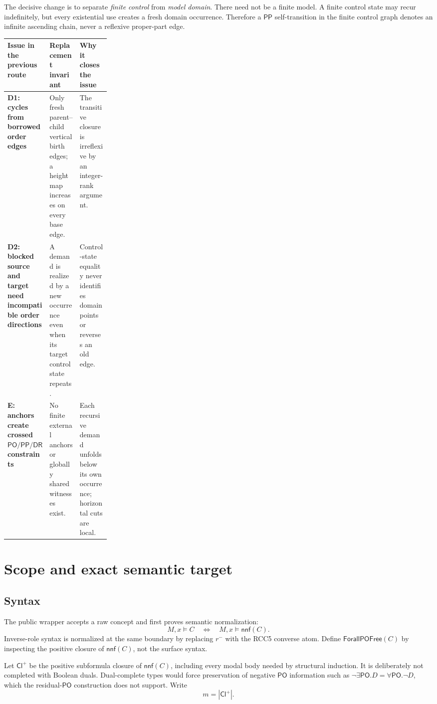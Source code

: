 \documentclass[11pt]{article}
\newcommand{\PP}{\mathsf{PP}}
\newcommand{\PO}{\mathsf{PO}}
\newcommand{\DR}{\mathsf{DR}}
\newcommand{\Cl}{\mathsf{Cl}^{+}}
\begin{document}
The decisive change is to separate \emph{finite control} from \emph{model domain}.
There need not be a finite model. A finite control state may recur indefinitely, but every
existential use creates a fresh domain occurrence. Therefore a $\PP$ self-transition in
the finite control graph denotes an infinite ascending chain, never a reflexive
proper-part edge.

\begin{center}
\renewcommand{\arraystretch}{1.25}
\begin{tabularx}{\linewidth}{>{\bfseries}p{0.24\linewidth}XX}
\toprule
Issue in the previous route & Replacement invariant & Why it closes the issue \\
\midrule
D1: cycles from borrowed order edges &
Only fresh parent--child vertical birth edges; a height map increases on every base edge. &
The transitive closure is irreflexive by an integer-rank argument. \\
D2: blocked source and target need incompatible order directions &
A demand is realized by a new occurrence even when its target control state repeats. &
Control-state equality never identifies domain points or reverses an old edge. \\
E: anchors create crossed $\PO/\PP/\DR$ constraints &
No finite external anchors or globally shared witnesses exist. &
Each recursive demand unfolds below its own occurrence; horizontal cuts are local. \\
\bottomrule
\end{tabularx}
\end{center}

\section{Scope and exact semantic target}

\subsection{Syntax}

The public wrapper accepts a raw concept and first proves semantic normalization:
\[
  M,x\models C\quad\Longleftrightarrow\quad M,x\models\mathsf{nnf}(C).
\]
Inverse-role syntax is normalized at the same boundary by replacing $r^{-}$ with the
RCC5 converse atom. Define $\mathsf{ForallPOFree}(C)$ by inspecting the positive closure
of $\mathsf{nnf}(C)$, not the surface syntax.

Let $\Cl$ be the positive subformula closure of $\mathsf{nnf}(C)$, including every modal
body needed by structural induction. It is deliberately not completed with Boolean duals.
Dual-complete types would force preservation of negative $\PO$ information such as
$\neg\exists\PO.D=\forall\PO.\neg D$, which the residual-$\PO$ construction does not
support. Write
\[
  m=|\Cl|.
\]
\end{document}
